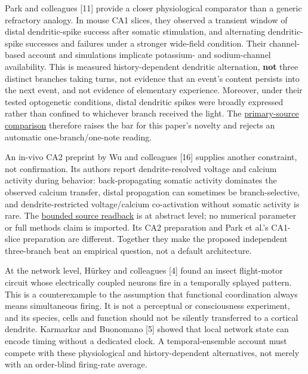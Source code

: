 \documentclass[
  american,
  11pt,
  letterpaper,
]{article}
\begin{document}
Park and colleagues {[}11{]} provide a closer physiological comparator than a generic refractory analogy. In mouse CA1 slices, they observed a transient window of distal dendritic-spike success after somatic stimulation, and alternating dendritic-spike successes and failures under a stronger wide-field condition. Their channel-based account and simulations implicate potassium- and sodium-channel availability. This is measured history-dependent dendritic alternation, \textbf{not} three distinct branches taking turns, not evidence that an event's content persists into the next event, and not evidence of elementary experience. Moreover, under their tested optogenetic conditions, distal dendritic spikes were broadly expressed rather than confined to whichever branch received the light. The \href{https://github.com/v5ma/v5ma.github.io/blob/f6d3867df89ae9dea32f763b1d55c84212c41cc6/papers/companions/five-papers-20260923/temporal/paper/reviews/PARK-2025-DENDRITIC-ALTERNATION-PRIMARY-COMPARISON-20260922.md}{primary-source comparison} therefore raises the bar for this paper's novelty and rejects an automatic one-branch/one-note reading.

An in-vivo CA2 preprint by Wu and colleagues {[}16{]} supplies another constraint, not confirmation. Its authors report dendrite-resolved voltage and calcium activity during behavior: back-propagating somatic activity dominates the observed calcium transfer, distal propagation can sometimes be branch-selective, and dendrite-restricted voltage/calcium co-activation without somatic activity is rare. The \href{https://github.com/v5ma/v5ma.github.io/blob/f6d3867df89ae9dea32f763b1d55c84212c41cc6/papers/companions/five-papers-20260923/temporal/paper/reviews/WU-2026-IN-VIVO-BRANCH-TRANSFER-BOUNDARY-20260922.md}{bounded source readback} is at abstract level; no numerical parameter or full methods claim is imported. Its CA2 preparation and Park et al.'s CA1-slice preparation are different. Together they make the proposed independent three-branch beat an empirical question, not a default architecture.

At the network level, Hürkey and colleagues {[}4{]} found an insect flight-motor circuit whose electrically coupled neurons fire in a temporally splayed pattern. This is a counterexample to the assumption that functional coordination always means simultaneous firing. It is not a perceptual or consciousness experiment, and its species, cells and function should not be silently transferred to a cortical dendrite. Karmarkar and Buonomano {[}5{]} showed that local network state can encode timing without a dedicated clock. A temporal-ensemble account must compete with these physiological and history-dependent alternatives, not merely with an order-blind firing-rate average.
\end{document}
